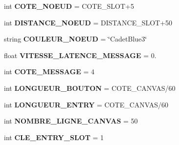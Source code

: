 \begin{DoxyCompactItemize}
\item 
int {\bfseries C\+O\+T\+E\+\_\+\+N\+O\+E\+UD} = C\+O\+T\+E\+\_\+\+S\+L\+OT+5\hypertarget{namespacesimulation__v2_a8dc37a8cc8ae720394f02d61bc74304e}{}\label{namespacesimulation__v2_a8dc37a8cc8ae720394f02d61bc74304e}

\item 
int {\bfseries D\+I\+S\+T\+A\+N\+C\+E\+\_\+\+N\+O\+E\+UD} = D\+I\+S\+T\+A\+N\+C\+E\+\_\+\+S\+L\+OT+50\hypertarget{namespacesimulation__v2_a6401e95df600779b11529d037b7e7904}{}\label{namespacesimulation__v2_a6401e95df600779b11529d037b7e7904}

\item 
string {\bfseries C\+O\+U\+L\+E\+U\+R\+\_\+\+N\+O\+E\+UD} = \char`\"{}Cadet\+Blue3\char`\"{}\hypertarget{namespacesimulation__v2_a495a112b21168bd36cf305906da9f7bd}{}\label{namespacesimulation__v2_a495a112b21168bd36cf305906da9f7bd}

\item 
float {\bfseries V\+I\+T\+E\+S\+S\+E\+\_\+\+L\+A\+T\+E\+N\+C\+E\+\_\+\+M\+E\+S\+S\+A\+GE} = 0.\hypertarget{namespacesimulation__v2_a0e294f6eed84f8101efdf0ec6c111c61}{}\label{namespacesimulation__v2_a0e294f6eed84f8101efdf0ec6c111c61}

\item 
int {\bfseries C\+O\+T\+E\+\_\+\+M\+E\+S\+S\+A\+GE} = 4\hypertarget{namespacesimulation__v2_aa300ba288f69a7fb4a81f192de821a60}{}\label{namespacesimulation__v2_aa300ba288f69a7fb4a81f192de821a60}

\item 
int {\bfseries L\+O\+N\+G\+U\+E\+U\+R\+\_\+\+B\+O\+U\+T\+ON} = C\+O\+T\+E\+\_\+\+C\+A\+N\+V\+AS/60\hypertarget{namespacesimulation__v2_a9ec2f5736b877c425596c88df16eb2cc}{}\label{namespacesimulation__v2_a9ec2f5736b877c425596c88df16eb2cc}

\item 
int {\bfseries L\+O\+N\+G\+U\+E\+U\+R\+\_\+\+E\+N\+T\+RY} = C\+O\+T\+E\+\_\+\+C\+A\+N\+V\+AS/60\hypertarget{namespacesimulation__v2_a384b1eebb2098291c47855839312caf2}{}\label{namespacesimulation__v2_a384b1eebb2098291c47855839312caf2}

\item 
int {\bfseries N\+O\+M\+B\+R\+E\+\_\+\+L\+I\+G\+N\+E\+\_\+\+C\+A\+N\+V\+AS} = 50\hypertarget{namespacesimulation__v2_a0abf4c4f56494f442b20326e5927c4e6}{}\label{namespacesimulation__v2_a0abf4c4f56494f442b20326e5927c4e6}

\item 
int {\bfseries C\+L\+E\+\_\+\+E\+N\+T\+R\+Y\+\_\+\+S\+L\+OT} = 1\hypertarget{namespacesimulation__v2_a84c85fe1e04a367bbb63f671974a3496}{}\label{namespacesimulation__v2_a84c85fe1e04a367bbb63f671974a3496}


\end{DoxyCompactItemize}
